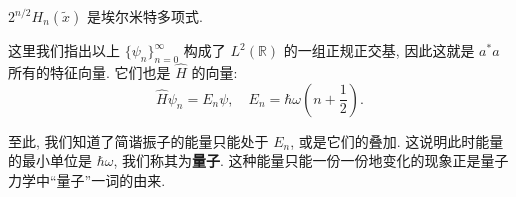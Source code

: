 \begin{remark}
    $ 2^{n/2}H_n(\tilde{x}) $ 是埃尔米特多项式.
\end{remark}

这里我们指出以上 $ \{\psi_n\}_{n=0}^{\infty} $ 构成了 $ L^2(\mathbb{R}) $ 的一组正规正交基\cite[定理 11.4]{hall2013quantum}, 因此这就是 $ a^*a $ 所有的特征向量. 它们也是 $ \hat{H} $ 的向量:
\[ \hat{H}\psi_n=E_n\psi,\quad E_n=\hbar\omega\left( n+\frac{1}{2} \right). \]

至此, 我们知道了简谐振子的能量只能处于 $ E_n $, 或是它们的叠加. 这说明此时能量的最小单位是 $ \hbar\omega $, 我们称其为{\bf 量子}. 这种能量只能一份一份地变化的现象正是量子力学中``量子''一词的由来.
